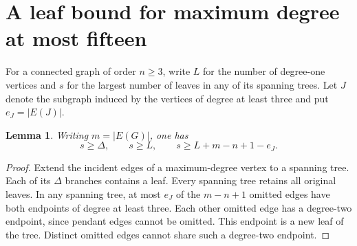 \documentclass[11pt,a4paper]{article}
\newtheorem{lemma}[theorem]{Lemma}\newtheorem{corollary}[theorem]{Corollary}
\begin{document}
\section{A leaf bound for maximum degree at most fifteen}\label{p07-sec:leaf15}
For a connected graph of order $n\ge3$, write $L$ for the number of
degree-one vertices and $s$ for the largest number of leaves in any of
its spanning trees. Let $J$ denote the subgraph induced by the vertices
of degree at least three and put $e_J=|E(J)|$.
\begin{lemma}\label{p07-lem:leaf15}
Writing $m=|E(G)|$, one has
\[
  s\ge\Delta,\qquad s\ge L,\qquad s\ge L+m-n+1-e_J .
\]
\end{lemma}
\begin{proof}
Extend the incident edges of a maximum-degree vertex to a spanning tree.
Each of its $\Delta$ branches contains a leaf. Every spanning tree
retains all original leaves. In any spanning tree, at most $e_J$ of
the $m-n+1$ omitted edges have both endpoints of degree at least three.
Each other omitted edge has a degree-two endpoint, since pendant edges
cannot be omitted. This endpoint is a new leaf of the tree. Distinct
omitted edges cannot share such a degree-two endpoint.
\end{proof}
\end{document}
